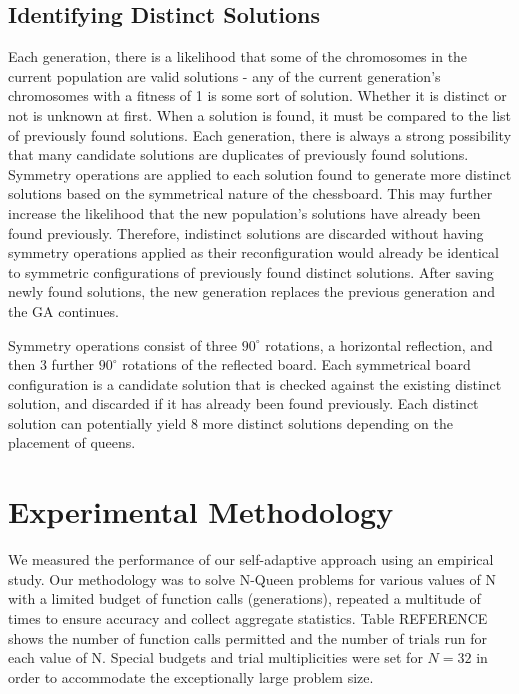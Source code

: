 \documentclass[conference]{IEEEtran}
\begin{document}
\subsection{Identifying Distinct Solutions}
Each generation, there is a likelihood that some of the chromosomes in the current population are valid solutions - any of the current generation's chromosomes with a fitness of 1 is some sort of solution. Whether it is distinct or not is unknown at first. When a solution is found, it must be compared to the list of previously found solutions. Each generation, there is always a strong possibility that many candidate solutions are duplicates of previously found solutions. Symmetry operations are applied to each solution found to generate more distinct solutions based on the symmetrical nature of the chessboard. This may further increase the likelihood that the new population's solutions have already been found previously. Therefore, indistinct solutions are discarded without having symmetry operations applied as their reconfiguration would already be identical to symmetric configurations of previously found distinct solutions. After saving newly found solutions, the new generation replaces the previous generation and the GA continues.

Symmetry operations consist of three $90^{\circ}$ rotations, a horizontal reflection, and then 3 further $90^{\circ}$ rotations of the reflected board. Each symmetrical board configuration is a candidate solution that is checked against the existing distinct solution, and discarded if it has already been found previously. Each distinct solution can potentially yield 8 more distinct solutions depending on the placement of queens.

\section{Experimental Methodology}
We measured the performance of our self-adaptive approach using an empirical study. Our methodology was to solve N-Queen problems for various values of N with a limited budget of function calls (generations), repeated a multitude of times to ensure accuracy and collect aggregate statistics. Table {REFERENCE} shows the number of function calls permitted and the number of trials run for each value of N. Special budgets and trial multiplicities were set for $N = 32$ in order to accommodate the exceptionally large problem size.
\end{document}
